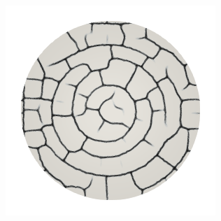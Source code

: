\begin{figure}[htb!]
\begin{subfigure}{0.19\textwidth}
    \end{subfigure}
    \begin{subfigure}{0.19\textwidth}
        \includegraphics[width=\textwidth]{past/figures/d_ring.png}
    \end{subfigure}
\end{figure}
